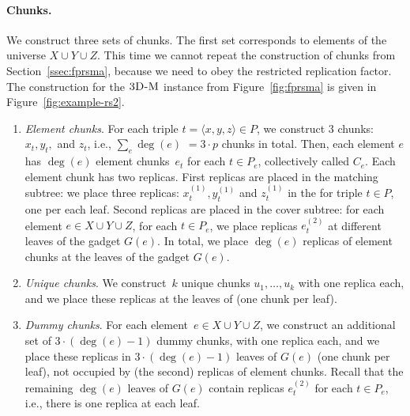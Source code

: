 \paragraph{Chunks.}
We construct three sets of chunks.
The first set corresponds to elements of the universe $X\cup Y\cup Z$.
This time we cannot repeat the construction of chunks from Section~\ref{ssec:fprsma}, because we need to obey the restricted replication factor.
The construction for the $\textsc{3D-M}$ instance from Figure~\ref{fig:fprsma} is given in Figure~\ref{fig:example-rs2}.
\begin{enumerate}
  \item \emph{Element chunks}. For each triple $t = \langle x, y, z \rangle \in P$, we construct $3$ chunks:~$x_t, y_t,$ and $z_t$, i.e., $\sum_e\deg(e)$ $=3\cdot p$ chunks in total.
  Then, each element $e$ has $\deg(e)$ element chunks~$e_t$ for each $t \in P_e$,  collectively called $C_e$.
  Each element chunk has two replicas. First replicas are placed in the matching subtree:
  we place
  three replicas: $x_t^{(1)}, y_t^{(1)}$ and $z_t^{(1)}$ in the {\TripleGadget} for triple $t\in P$, one per each leaf.
  Second replicas are placed in the cover subtree:
  for each element $e \in X\cup Y\cup Z$, for each $t \in P_e$,
  we place replicas $e_t^{(2)}$ at different leaves of the gadget $G(e)$.
  In total, we place $\deg(e)$ replicas of element chunks at the leaves of the gadget $G(e)$.
  \item \emph{Unique chunks}. We construct~$k$ unique chunks $u_1, \ldots, u_k$ with one replica each, and we place these replicas at the leaves of {\UnqGadgets} (one chunk per leaf).
  \item \emph{Dummy chunks}. For each element~$e\in X\cup Y\cup Z$,
  we construct an additional set of $3\cdot(\deg(e) - 1)$ dummy chunks, with one replica each, and we place these replicas in $3\cdot (\deg(e)-1)$ leaves of $G(e)$ (one chunk per leaf),
  not occupied by (the second) replicas of element chunks.
  Recall that the remaining $\deg(e)$ leaves of $G(e)$ contain replicas $e_t^{(2)}$ for each $t \in P_e$, i.e., there is one replica at each leaf.
\end{enumerate}

